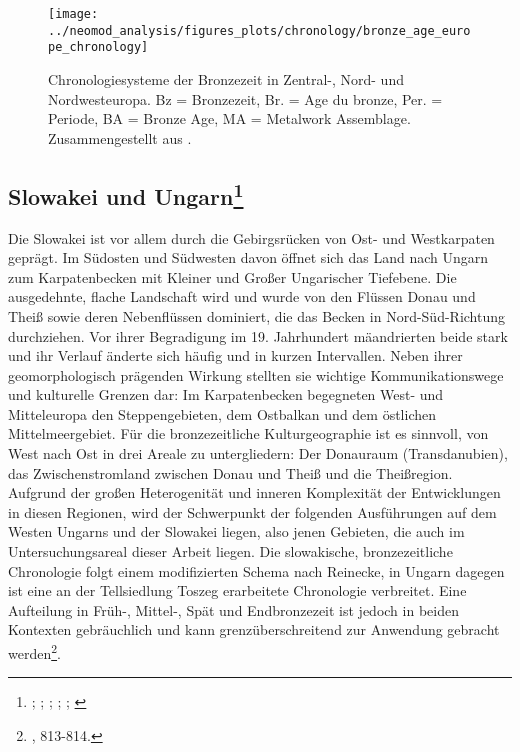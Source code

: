 \documentclass[openany,twoside,twocolumn]{book}
\let\rmarkdownfootnote\footnote%
\def\footnote{\protect\rmarkdownfootnote}
\begin{document}
\begin{landscape}
\begin{figure}
\texttt{[image: ../neomod\_analysis/figures\_plots/chronology/bronze\_age\_europe\_chronology]} \caption[Chronologiesysteme der Bronzezeit in Zentral-, Nord- und Nordwesteuropa]{Chronologiesysteme der Bronzezeit in Zentral-, Nord- und Nordwesteuropa. Bz = Bronzezeit, Br. = Age du bronze, Per. = Periode, BA = Bronze Age, MA = Metalwork Assemblage. Zusammengestellt aus \textcite{roberts_old_2013}.}\label{fig:general-chronology}
\end{figure}
\end{landscape}

\hypertarget{slowakei-und-ungarn}{%
\subsection[Slowakei und Ungarn]{\texorpdfstring{Slowakei und
Ungarn\footnote{\textcite{furmanek_bronzezeit_1999};
  \textcite{kemenczei_spatbronzezeit_1984};
  \textcite{lochner_bestattungssitten_2013};
  \textcite{markova_slovakia_2013}; \textcite{sorensen_landscapes_2008};
  \textcite{vicze_bestattungen_1992}}}{Slowakei und Ungarn}}\label{slowakei-und-ungarn}}

Die Slowakei ist vor allem durch die Gebirgsrücken von Ost- und
Westkarpaten geprägt. Im Südosten und Südwesten davon öffnet sich das
Land nach Ungarn zum Karpatenbecken mit Kleiner und Großer Ungarischer
Tiefebene. Die ausgedehnte, flache Landschaft wird und wurde von den
Flüssen Donau und Theiß sowie deren Nebenflüssen dominiert, die das
Becken in Nord-Süd-Richtung durchziehen. Vor ihrer Begradigung im 19.
Jahrhundert mäandrierten beide stark und ihr Verlauf änderte sich häufig
und in kurzen Intervallen. Neben ihrer geomorphologisch prägenden
Wirkung stellten sie wichtige Kommunikationswege und kulturelle Grenzen
dar: Im Karpatenbecken begegneten West- und Mitteleuropa den
Steppengebieten, dem Ostbalkan und dem östlichen Mittelmeergebiet. Für
die bronzezeitliche Kulturgeographie ist es sinnvoll, von West nach Ost
in drei Areale zu untergliedern: Der Donauraum (Transdanubien), das
Zwischenstromland zwischen Donau und Theiß und die Theißregion. Aufgrund
der großen Heterogenität und inneren Komplexität der Entwicklungen in
diesen Regionen, wird der Schwerpunkt der folgenden Ausführungen auf dem
Westen Ungarns und der Slowakei liegen, also jenen Gebieten, die auch im
Untersuchungsareal dieser Arbeit liegen. Die slowakische,
bronzezeitliche Chronologie folgt einem modifizierten Schema nach
Reinecke, in Ungarn dagegen ist eine an der Tellsiedlung Toszeg
erarbeitete Chronologie verbreitet. Eine Aufteilung in Früh-, Mittel-,
Spät und Endbronzezeit ist jedoch in beiden Kontexten gebräuchlich und
kann grenzüberschreitend zur Anwendung gebracht werden\footnote{\textcite{markova_slovakia_2013},
  813-814.}.
\end{document}
